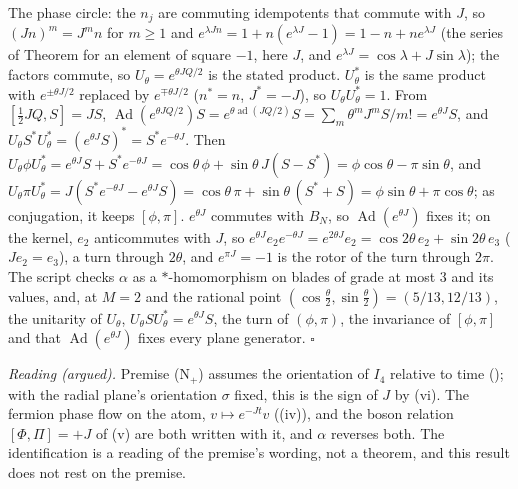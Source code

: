 The phase circle: the $n_{j}$ are commuting idempotents that commute with $J$, so $(Jn)^{m} = J^{m}n$ for $m \ge 1$ and $e^{\lambda Jn} = 1 + n(e^{\lambda J} - 1) = 1 - n + ne^{\lambda J}$ (the series of Theorem  for an element of square $-1$, here $J$, and $e^{\lambda J} = \cos\lambda + J\sin\lambda$); the factors commute, so $U_{\theta} = e^{\theta JQ/2}$ is the stated product. $U_{\theta}^{*}$ is the same product with $e^{\pm\theta J/2}$ replaced by $e^{\mp\theta J/2}$ ($n^{*} = n$, $J^{*} = -J$), so $U_{\theta}U_{\theta}^{*} = 1$. From $[\tfrac12JQ, S] = JS$, $\operatorname{Ad}(e^{\theta JQ/2})S = e^{\theta\operatorname{ad}(JQ/2)}S = \sum_{m}\theta^{m}J^{m}S/m! = e^{\theta J}S$, and $U_{\theta}S^{*}U_{\theta}^{*} = (e^{\theta J}S)^{*} = S^{*}e^{-\theta J}$. Then $U_{\theta}\phi U_{\theta}^{*} = e^{\theta J}S + S^{*}e^{-\theta J} = \cos\theta\,\phi + \sin\theta\,J(S - S^{*}) = \phi\cos\theta - \pi\sin\theta$, and $U_{\theta}\pi U_{\theta}^{*} = J(S^{*}e^{-\theta J} - e^{\theta J}S) = \cos\theta\,\pi + \sin\theta\,(S^{*} + S) = \phi\sin\theta + \pi\cos\theta$; as conjugation, it keeps $[\phi, \pi]$. $e^{\theta J}$ commutes with $B_{N}$, so $\operatorname{Ad}(e^{\theta J})$ fixes it; on the kernel, $e_{2}$ anticommutes with $J$, so $e^{\theta J}e_{2}e^{-\theta J} = e^{2\theta J}e_{2} = \cos 2\theta\,e_{2} + \sin 2\theta\,e_{3}$ ($Je_{2} = e_{3}$), a turn through $2\theta$, and $e^{\pi J} = -1$ is the rotor of the turn through $2\pi$. The script checks $\alpha$ as a $*$-homomorphism on blades of grade at most $3$ and its values, and, at $M = 2$ and the rational point $(\cos\tfrac{\theta}{2}, \sin\tfrac{\theta}{2}) = (5/13, 12/13)$, the unitarity of $U_{\theta}$, $U_{\theta}SU_{\theta}^{*} = e^{\theta J}S$, the turn of $(\phi, \pi)$, the invariance of $[\phi, \pi]$ and that $\operatorname{Ad}(e^{\theta J})$ fixes every plane generator. $\square$

\emph{Reading (argued).} Premise (N$_{+}$) assumes the orientation of $I_{4}$ relative to time (); with the radial plane's orientation $\sigma$ fixed, this is the sign of $J$ by (vi). The fermion phase flow on the atom, $v \mapsto e^{-Jt}v$ ((iv)), and the boson relation $[\Phi, \Pi] = +J$ of (v) are both written with it, and $\alpha$ reverses both. The identification is a reading of the premise's wording, not a theorem, and this result does not rest on the premise.
